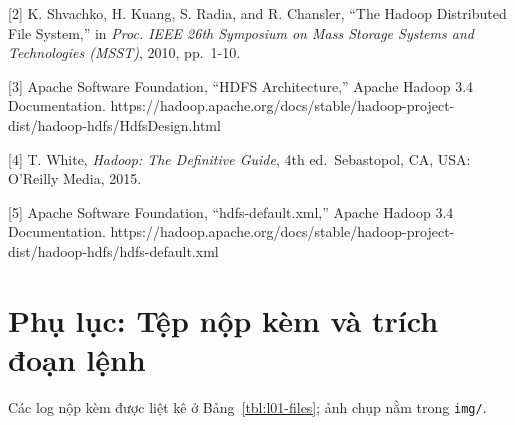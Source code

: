 \documentclass[
  12pt,
  a4paper,
]{article}
\begin{document}
{[}2{]} K. Shvachko, H. Kuang, S. Radia, and R. Chansler, ``The Hadoop
Distributed File System,'' in \emph{Proc. IEEE 26th Symposium on Mass
Storage Systems and Technologies (MSST)}, 2010, pp.~1-10.

{[}3{]} Apache Software Foundation, ``HDFS Architecture,'' Apache Hadoop
3.4 Documentation.
https://hadoop.apache.org/docs/stable/hadoop-project-dist/hadoop-hdfs/HdfsDesign.html

{[}4{]} T. White, \emph{Hadoop: The Definitive Guide}, 4th
ed.~Sebastopol, CA, USA: O'Reilly Media, 2015.

{[}5{]} Apache Software Foundation, ``hdfs-default.xml,'' Apache Hadoop
3.4 Documentation.
https://hadoop.apache.org/docs/stable/hadoop-project-dist/hadoop-hdfs/hdfs-default.xml

\section*{Phụ lục: Tệp nộp kèm và trích đoạn
lệnh}\label{phux1ee5-lux1ee5c-tux1ec7p-nux1ed9p-kuxe8m-vuxe0-truxedch-ux111oux1ea1n-lux1ec7nh}

Các log nộp kèm được liệt kê ở Bảng~\ref{tbl:l01-files}; ảnh chụp nằm
trong \texttt{img/}.
\end{document}
